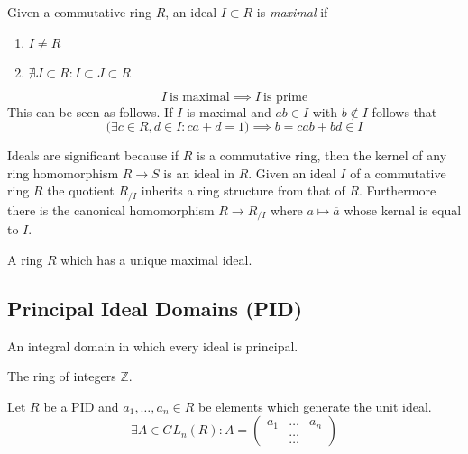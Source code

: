\begin{definition}\label{def:max_ideal}
   Given a commutative ring \(R\), an ideal \(I \subset R\) is \emph{maximal} if
   \begin{enumerate}[label=\roman*, align=Center]
      \item \(I \neq R\)
      \item \(\nexists J \subset R: I \subset J \subset R\)
   \end{enumerate}
\end{definition}
\begin{remark}
   \[I~\text{is maximal} \implies I~\text{is prime}\]
   This can be seen as follows.
   If \(I\) is maximal and \(ab \in I\) with \(b \notin I\) follows that
   \[\big(\exists c \in R, d \in I: ca + d = 1\big) \implies b = cab + bd \in I\]
\end{remark}
Ideals are significant because if \(R\) is a commutative ring, then the kernel of any ring homomorphism \(R \to S\) is an ideal in \(R\).
Given an ideal \(I\) of a commutative ring \(R\) the quotient \(R_{/I}\) inherits a ring structure from that of \(R\).
Furthermore there is the canonical homomorphism \(R \to R_{/I}\) where \(a \mapsto \overline{a}\) whose kernal is equal to \(I\).
\begin{definition}
   A ring \(R\) which has a unique maximal ideal.
\end{definition}

\subsection{Principal Ideal Domains (PID)}
\begin{definition}
   An integral domain in which every ideal is principal.
\end{definition}
\begin{example}
   The ring of integers \(\mathbb{Z}\).
\end{example}

\begin{lemma}
   Let \(R\) be a PID and \(a_1, \ldots, a_n \in R\) be elements which generate the unit ideal.
   \[\exists A \in GL_n(R): A = \begin{pmatrix}a_1 & \ldots & a_n\\ & \ldots & \\ & \ldots & \end{pmatrix}\]
\end{lemma}

